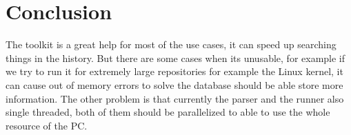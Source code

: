 \chapter{Conclusion}
\label{ch:sum}

The toolkit is a great help for most of the use cases, it can speed up searching things in the history.
But there are some cases when its unusable, for example if we try to run it for extremely large repositories
for example the Linux kernel, it can cause out of memory errors to solve the database should be able store more
information. The other problem is that currently the parser and the runner also single threaded, both of them
should be parallelized to able to use the whole resource of the PC.